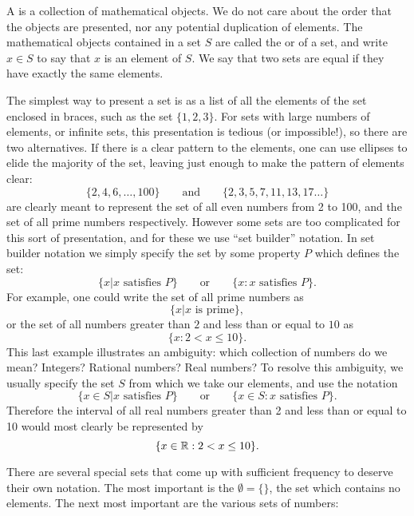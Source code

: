 A  is a collection of mathematical objects.  We do not care about
the order that the objects are presented, nor any potential duplication of
elements.  The mathematical objects contained in a set $S$ are called
the  or  of a set, and write $x \in S$ to say
that $x$ is an element of $S$.  We say that two sets are equal if they have
exactly the same elements.

The simplest way to present a set is as a list of all the elements of
the set enclosed in braces, such as the set $\{1, 2, 3\}$.  For sets
with large numbers of elements, or infinite sets, this presentation is
tedious (or impossible!), so there are two alternatives.  If there is
a clear pattern to the elements, one can use ellipses to elide the
majority of the set, leaving just enough to make the pattern of
elements clear:
\[
  \{2, 4, 6, \ldots, 100\} \qquad \text{and} \qquad \{2, 3, 5, 7, 11, 
  13, 17
\ldots\}
\]
are clearly meant to represent the set of all even numbers from 2 to 100,
and the set of all prime numbers respectively.  However some sets are too
complicated for this sort of presentation, and for these we use ``set
builder'' notation.  In set builder notation we simply specify the set by
some property $P$ which defines the set:
\[
  \{x | x \text{ satisfies } P\} \qquad \text{or} \qquad \{x : x \text{ satisfies }
P\}.
\]
For example, one could write the set of all prime numbers as
\[
  \{ x | x \text{ is prime}\},
\]
or the set of all numbers greater than $2$ and less than or equal to $10$ as
\[
  \{ x : 2 < x \le 10 \}.
\]
This last example illustrates an ambiguity: which collection of numbers do
we mean? Integers? Rational numbers? Real numbers?  To resolve this
ambiguity, we usually specify the set $S$ from which we take our elements,
and use the notation
\[
  \{x \in S | x \text{ satisfies } P\} \qquad \text{or} \qquad \{x \in S : x
\text{ satisfies } P\}.
\]
Therefore the interval of all real numbers greater than 2 and less than or
equal to 10 would most clearly be represented by
\[
  \{ x \in \mathbb{R} : 2 < x \le 10\}.
\]

There are several special sets that come up with sufficient frequency to
deserve their own notation.  The most important is the 
$\emptyset = \{\}$, the set which contains no elements.  The next most
important are the various sets of numbers:

